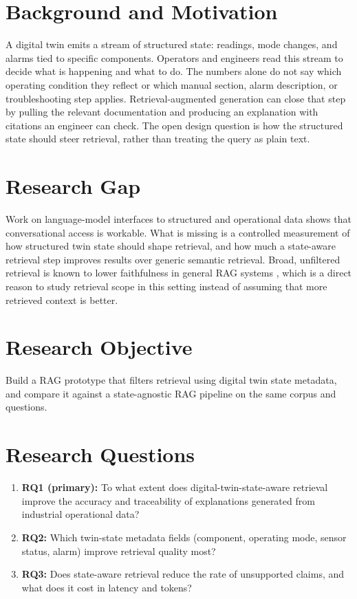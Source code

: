 \documentclass[10pt,a4paper]{article}
\begin{document}
\section{Background and Motivation}

A digital twin emits a stream of structured state: readings, mode changes, and alarms tied to specific components. Operators and engineers read this stream to decide what is happening and what to do. The numbers alone do not say which operating condition they reflect or which manual section, alarm description, or troubleshooting step applies. Retrieval-augmented generation can close that step by pulling the relevant documentation and producing an explanation with citations an engineer can check. The open design question is how the structured state should steer retrieval, rather than treating the query as plain text.

\section{Research Gap}

Work on language-model interfaces to structured and operational data shows that conversational access is workable. What is missing is a controlled measurement of how structured twin state should shape retrieval, and how much a state-aware retrieval step improves results over generic semantic retrieval. Broad, unfiltered retrieval is known to lower faithfulness in general RAG systems \cite{gao2024survey, es2024ragas}, which is a direct reason to study retrieval scope in this setting instead of assuming that more retrieved context is better.

\section{Research Objective}

Build a RAG prototype that filters retrieval using digital twin state metadata, and compare it against a state-agnostic RAG pipeline on the same corpus and questions.

\section{Research Questions}

\begin{enumerate}
    \item \textbf{RQ1 (primary):} To what extent does digital-twin-state-aware retrieval improve the accuracy and traceability of explanations generated from industrial operational data?
    \item \textbf{RQ2:} Which twin-state metadata fields (component, operating mode, sensor status, alarm) improve retrieval quality most?
    \item \textbf{RQ3:} Does state-aware retrieval reduce the rate of unsupported claims, and what does it cost in latency and tokens?
\end{enumerate}
\end{document}
